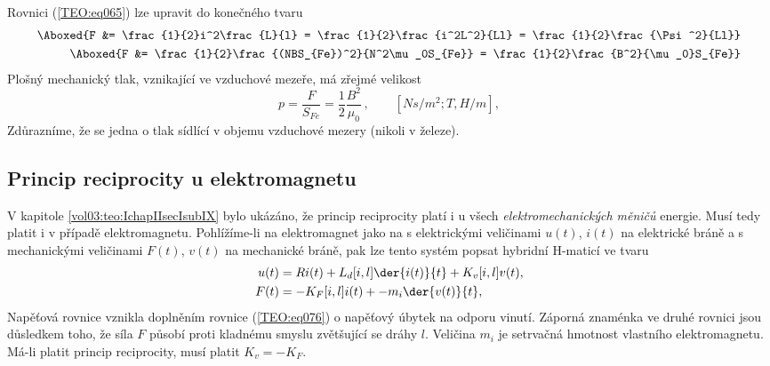       Rovnici (\ref{TEO:eq065}) lze upravit do konečného tvaru
      \begin{subequations}
        \begin{align}  %
           \Aboxed{F &= \frac{1}{2}i^2\frac{L}{l}    
                      = \frac{1}{2}\frac{i^2L^2}{Ll}
                      = \frac{1}{2}\frac{\Psi^2}{Ll}}                     \label{TEO:eq069a} \\
           \Aboxed{F &= \frac{1}{2}\frac{(NBS_{Fe})^2}{N^2\mu_0S_{Fe}}
                      = \frac{1}{2}\frac{B^2}{\mu_0}S_{Fe}}               \label{TEO:eq069b}
        \end{align}
      \end{subequations}
      Plošný mechanický tlak, vznikající ve vzduchové mezeře, má zřejmé velikost 
      \begin{equation}\label{TEO:eq068}
        \boxed{p = \frac{F}{S_{Fe}} = \frac{1}{2}\frac{B^2}{\mu_0}}\,, \qquad [Ns/m^2; T, H/m],
      \end{equation}
      Zdůrazníme, že se jedna o tlak sídlící v objemu vzduchové mezery (nikoli v železe).
      
    \subsection{Princip reciprocity u elektromagnetu}
      V kapitole \ref{vol03:teo:IchapIIsecIsubIX} bylo ukázáno, že princip reciprocity platí i u
      všech \emph{elektromechanických měničů} energie. Musí tedy platit i v případě elektromagnetu.
      Pohlížíme-li na elektromagnet jako na  s elektrickými veličinami
      \(u(t)\), \(i(t)\) na elektrické bráně a s mechanickými veličinami \(F(t)\), \(v(t)\) na
      mechanické bráně, pak lze tento systém popsat hybridní H-maticí ve tvaru
      \begin{subequations}
      \label{TEO:eq075}
        \begin{align}
          u(t) &= Ri(t) + L_d[i,l]\der{i(t)}{t} + K_v[i,l]v(t),  \label{TEO:eq075a} \\
          F(t) &= - K_F[i,l]i(t) + -m_i\der{v(t)}{t},            \label{TEO:eq075b} 
        \end{align}
      \end{subequations}
      Napěťová rovnice vznikla doplněním rovnice (\ref{TEO:eq076}) o napěťový úbytek na odporu 
      vinutí. Záporná znaménka ve druhé rovnici jsou důsledkem toho, že síla \(F\) působí proti 
      kladnému smyslu zvětšující se dráhy \(l\). Veličina \(m_i\) je setrvačná hmotnost vlastního 
      elektromagnetu. Má-li platit princip reciprocity, musí platit \(K_v = - K_F\).
      

